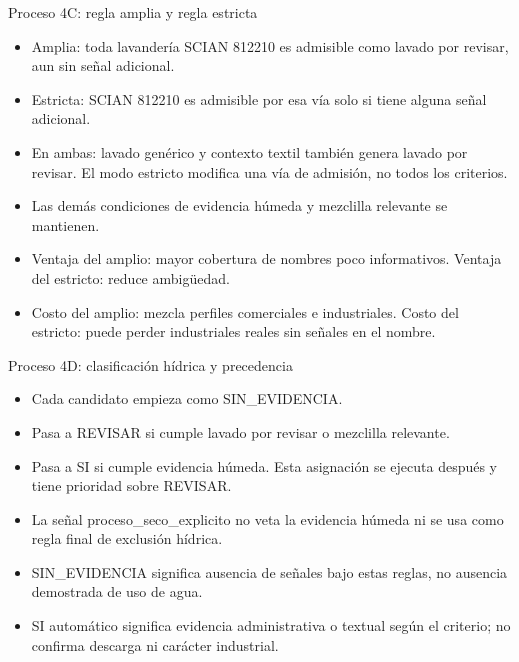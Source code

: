 \documentclass[aspectratio=169,10pt]{beamer}
\begin{document}
\begin{frame}{Proceso 4C: regla amplia y regla estricta}
\small
\begin{itemize}
\item Amplia: toda lavandería SCIAN 812210 es admisible como lavado por revisar, aun sin señal adicional.
\item Estricta: SCIAN 812210 es admisible por esa vía solo si tiene alguna señal adicional.
\item En ambas: lavado genérico y contexto textil también genera lavado por revisar. El modo estricto modifica una vía de admisión, no todos los criterios.
\item Las demás condiciones de evidencia húmeda y mezclilla relevante se mantienen.
\item Ventaja del amplio: mayor cobertura de nombres poco informativos. Ventaja del estricto: reduce ambigüedad.
\item Costo del amplio: mezcla perfiles comerciales e industriales. Costo del estricto: puede perder industriales reales sin señales en el nombre.
\end{itemize}
\end{frame}
\begin{frame}{Proceso 4D: clasificación hídrica y precedencia}
\small
\begin{itemize}
\item Cada candidato empieza como SIN\_EVIDENCIA.
\item Pasa a REVISAR si cumple lavado por revisar o mezclilla relevante.
\item Pasa a SI si cumple evidencia húmeda. Esta asignación se ejecuta después y tiene prioridad sobre REVISAR.
\item La señal proceso\_seco\_explicito no veta la evidencia húmeda ni se usa como regla final de exclusión hídrica.
\item SIN\_EVIDENCIA significa ausencia de señales bajo estas reglas, no ausencia demostrada de uso de agua.
\item SI automático significa evidencia administrativa o textual según el criterio; no confirma descarga ni carácter industrial.
\end{itemize}
\end{frame}
\end{document}
